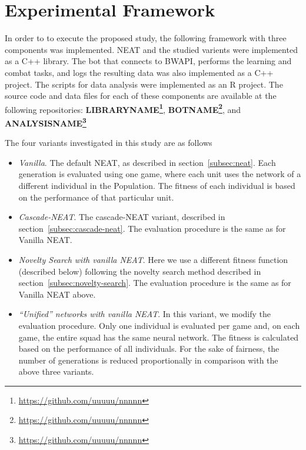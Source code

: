 \section{Experimental Framework}\label{section:proposal}

In order to to execute the proposed study, the following framework
with three components was implemented. NEAT and the studied varients
were implemented as a C++ library. The bot that connects to BWAPI,
performs the learning and combat tasks, and logs the resulting data
was also implemented as a C++ project. The scripts for data analysis
were implemented as an R project. The source code and data files for
each of these components are available at the following repositories:
{\bf LIBRARYNAME\footnote{\url{https://github.com/uuuuu/nnnnn}}}, {\bf
  BOTNAME\footnote{\url{https://github.com/uuuuu/nnnnn}}}, and {\bf
  ANALYSISNAME\footnote{\url{https://github.com/uuuuu/nnnnn}}}


The four variants investigated in this study are as follows
\begin{itemize}
    \item \emph{Vanilla}. The default NEAT, as described in
      section~\ref{subsec:neat}. Each generation is evaluated using one
      game, where each unit uses the network of a different individual
      in the Population. The fitness of each individual is based on
      the performance of that particular unit.
    \item \emph{Cascade-NEAT}. The cascade-NEAT variant, described in
      section~\ref{subsec:cascade-neat}. The evaluation procedure is
      the same as for Vanilla NEAT.
    \item \emph{Novelty Search with vanilla NEAT}. Here we use a
      different fitness function (described below) following the
      novelty search method described in
      section~\ref{subsec:novelty-search}. The evaluation procedure is
      the same as for Vanilla NEAT above.
    \item \emph{``Unified'' networks with vanilla NEAT}. In this
      variant, we modify the evaluation procedure. Only one individual
      is evaluated per game and, on each game, the entire squad has
      the same neural network. The fitness is calculated based on the
      performance of all individuals. For the sake of fairness, the
      number of generations is reduced proportionally in comparison
      with the above three variants.
\end{itemize}


